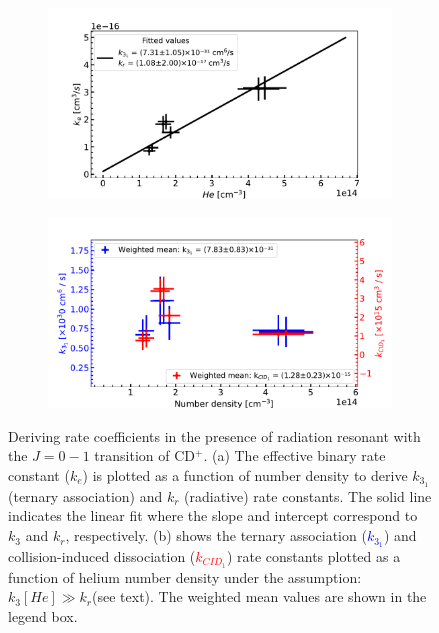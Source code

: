 \begin{figure}[!htb]
    \centering
    \begin{subfigure}[b]{0.49\textwidth}
        \centering
        \includegraphics[width=1\textwidth]{figures/measurements/kinetics/functionOf_nHe/on_4.8K_k31_effective_rate_constants.pdf}
        \caption{}
        \label{fig:on:effective-rate-constants}
    \end{subfigure}
    \hfill
    \begin{subfigure}[b]{0.49\textwidth}
        \centering
        \includegraphics[width=1\textwidth]{figures/measurements/kinetics/functionOf_nHe/on_4.8K_k3_kCID_1_as_functionOfnHe.pdf}
        \caption{}
        \label{fig:on:rate-constants}
    \end{subfigure}

    \caption{Deriving rate coefficients in the presence of radiation resonant with the $J=0-1$ transition of CD$^+$. (a) The effective binary rate constant ($k_e$) is plotted as a function of number density to derive $k_{3_1}$ (ternary association) and $k_r$ (radiative) rate constants. The solid line indicates the linear fit where the slope and intercept correspond to $k_3$ and $k_r$, respectively. (b) shows the ternary association (\textcolor{blue}{$k_{3_1}$}) and collision-induced dissociation (\textcolor{red}{$k_{CID_1}$}) rate constants plotted as a function of helium number density under the assumption: $k_3[He] \gg k_r$(see text). The weighted mean values are shown in the legend box.}
    \label{fig:on:effective-and-ternary}

\end{figure}
